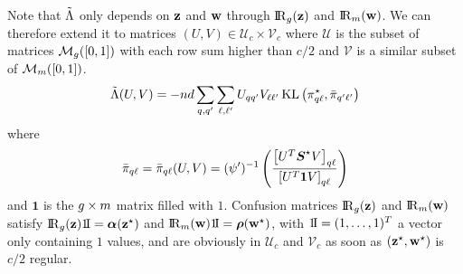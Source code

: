  Note that $\tilde{\Lambda}$ only depends on $\mathbf{z}$ and $\mathbf{w}$ through $\Rgbz$ and $\Rmbw$. We can therefore extend it to matrices $(U, V) \in \mathcal{U}_c \times\mathcal{V}_c$ where $\mathcal{U}$ is the subset of matrices $\mathcal{M}_{g}([0, 1])$ with each row sum higher than $c/2$ and $\mathcal{V}$ is a similar subset of $\mathcal{M}_{m}([0, 1])$. 
\[
  \tilde{\Lambda}(U, V)  = - nd \sum_{q,q'} \sum_{\ell,\ell'} U_{qq'} V_{\ell\ell'} \operatorname{KL}\left(\pi^\star_{q\ell}, \bar{\pi}_{q'\ell'} \right)
  \] where
\[ \bar{\pi}_{q\ell} = \bar{\pi}_{q\ell}(U, V) = (\psi')^{-1} \left( \frac{\left[U{^{T}} \boldsymbol{S}^{\star} V \right]_{q\ell}}{\left[U{^{T}} \mathbf{1} V \right]_{q\ell}} \right) 
\]
and $\mathbf{1}$ is the $g \times m$ matrix filled with $1$. Confusion matrices $\Rgbz$ and $\Rmbw$ satisfy $\Rgbz \un = \bpi(\bzs)$ and $\Rmbw \un = \brho(\bws)$, with $\un=(1,\ldots, 1)\transpose$ a vector only containing $1$ values, and are obviously in $\mathcal{U}_c$ and $\mathcal{V}_c$ as soon as $(\mathbf{z}^\star, \mathbf{w}^\star)$ is $c/2$ regular. 


